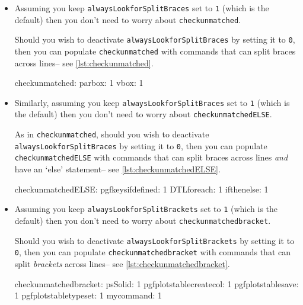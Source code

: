\begin{itemize}
 		\item[\color{red}\verbitem{checkunmatched}] Assuming you keep \lstinline!alwaysLookforSplitBraces! set to \lstinline!1! (which
 		is the default) then you don't need to worry about \lstinline!checkunmatched!. 
 		 		 		 		 					
 		Should you wish to deactivate \lstinline!alwaysLookforSplitBraces! by setting it to \lstinline!0!, then 
 		you can populate \lstinline!checkunmatched! with commands that can split braces across 
 		lines-- see \cref{lst:checkunmatched}.
 		 		 		 		 					
 		\begin{yaml}[caption={\lstinline!checkunmatched!},label={lst:checkunmatched}]
checkunmatched:
    parbox: 1
    vbox: 1
 		\end{yaml}
 		\item[\color{red}\verbitem{checkunmatchedELSE}] Similarly, assuming you keep \lstinline!alwaysLookforSplitBraces! set to \lstinline!1! (which
 		is the default) then you don't need to worry about \lstinline!checkunmatchedELSE!. 
 		 		 		 		 					
 		As in \lstinline!checkunmatched!, should you wish to deactivate \lstinline!alwaysLookforSplitBraces! by setting it to \lstinline!0!, then 
 		you can populate \lstinline!checkunmatchedELSE! with commands that can split braces across 
 		lines \emph{and} have an `else' statement-- see \cref{lst:checkunmatchedELSE}.
 		 		 		 		 					
 		\begin{yaml}[caption={\lstinline!checkunmatchedELSE!},label={lst:checkunmatchedELSE}]
checkunmatchedELSE:
    pgfkeysifdefined: 1
    DTLforeach: 1
    ifthenelse: 1
 		\end{yaml}
 		\item[\color{red}\verbitem{checkunmatchedbracket}] Assuming you keep \lstinline!alwaysLookforSplitBrackets! 
 		set to \lstinline!1! (which is the default) then you don't need to worry about \lstinline!checkunmatchedbracket!. 
 		 		 		 		 					
 		Should you wish to deactivate \lstinline!alwaysLookforSplitBrackets! by setting it 
 		to \lstinline!0!, then you can populate \lstinline!checkunmatchedbracket! with commands that can 
 		split \emph{brackets} across lines-- see \cref{lst:checkunmatchedbracket}.
 		 		 		 		 					
 		\begin{yaml}[caption={\lstinline!checkunmatchedbracket!},label={lst:checkunmatchedbracket}]
checkunmatchedbracket:
    psSolid: 1
    pgfplotstablecreatecol: 1
    pgfplotstablesave: 1
    pgfplotstabletypeset: 1
    mycommand: 1
 		\end{yaml}
 	\end{itemize}
 	 	 	 	 	
